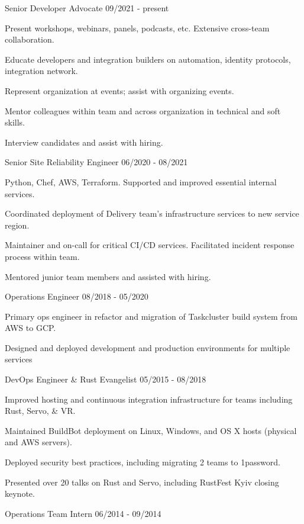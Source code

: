 \documentclass[11pt]{article} %
\begin{document}
\begin{description}
\squish

           {Senior Developer Advocate}
           {09/2021 - present}

Present workshops, webinars, panels, podcasts, etc. Extensive cross-team collaboration. 

Educate developers and integration builders on automation, identity protocols, integration network. 

Represent organization at events; assist with organizing events. 

Mentor colleagues within team and across organization in technical and soft skills. 

Interview candidates and assist with hiring. 

           {Senior Site Reliability Engineer}
           {06/2020 - 08/2021}

Python, Chef, AWS, Terraform. Supported and improved essential internal services.  

Coordinated deployment of Delivery team's infrastructure services to new service region.

Maintainer and on-call for critical CI/CD services. Facilitated incident response process within team.

Mentored junior team members and assisted with hiring.

           {Operations Engineer}
           {08/2018 - 05/2020}

Primary ops engineer in refactor and migration of Taskcluster build system 
from AWS to GCP. 

Designed and deployed development and production environments for multiple services

           {DevOps Engineer \& Rust Evangelist}
           {05/2015 - 08/2018}

Improved hosting and continuous integration infrastructure for teams
including Rust, Servo, \& VR.

Maintained BuildBot deployment on Linux, Windows, and OS X hosts (physical and
AWS servers).

Deployed security best practices, including migrating 2 teams to 1password.

Presented over 20 talks on Rust and Servo, including RustFest Kyiv closing keynote.

           {Operations Team Intern}
           {06/2014 - 09/2014}


\end{description}
\end{document}
